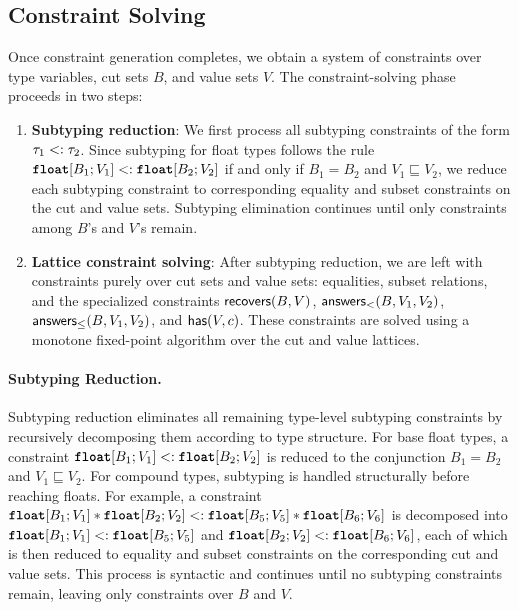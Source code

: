 

\subsection{Constraint Solving}
 \noindent
Once constraint generation completes, we obtain a system of constraints over type variables, cut sets $B$, and value sets $V$. The constraint-solving phase proceeds in two steps:



\begin{enumerate}
    \item \textbf{Subtyping reduction}: We first process all subtyping constraints of the form $\tau_1 <: \tau_2$. Since subtyping for float types follows the rule $\textnormal{\ttfamily\bfseries float}[B_1;V_1] <: \textnormal{\ttfamily\bfseries float}[B_2;V_2]$ if and only if $B_1 = B_2$ and $V_1 \sqsubseteq V_2$, we reduce each subtyping constraint to corresponding equality and subset constraints on the cut and value sets. Subtyping elimination continues until only constraints among $B$'s and $V$'s remain.

    \item \textbf{Lattice constraint solving}: After subtyping reduction, we are left with constraints purely over cut sets and value sets: equalities, subset relations, and the specialized constraints $\mathsf{recovers}(B, V)$, $\mathsf{answers}_<(B, V_1, V_2)$, $\mathsf{answers}_{\leq}(B, V_1, V_2)$, and $\mathsf{has}(V, c)$. These constraints are solved using a monotone fixed-point algorithm over the cut and value lattices.
\end{enumerate}

\paragraph{Subtyping Reduction.}
Subtyping reduction eliminates all remaining type-level subtyping constraints by recursively decomposing them according to type structure.
For base float types, a constraint
$\textnormal{\ttfamily\bfseries float}[B_1;V_1] <: \textnormal{\ttfamily\bfseries float}[B_2;V_2]$
is reduced to the conjunction $B_1 = B_2$ and $V_1 \sqsubseteq V_2$.
For compound types, subtyping is handled structurally before reaching floats.
For example, a constraint
$\textnormal{\ttfamily\bfseries float}[B_1;V_1] * \textnormal{\ttfamily\bfseries float}[B_2;V_2] <: \textnormal{\ttfamily\bfseries float}[B_5;V_5] * \textnormal{\ttfamily\bfseries float}[B_6;V_6]$
is decomposed into
$\textnormal{\ttfamily\bfseries float}[B_1;V_1] <: \textnormal{\ttfamily\bfseries float}[B_5;V_5]$
and
$\textnormal{\ttfamily\bfseries float}[B_2;V_2] <: \textnormal{\ttfamily\bfseries float}[B_6;V_6]$,
each of which is then reduced to equality and subset constraints on the corresponding cut
and value sets.
This process is syntactic and continues until no subtyping constraints remain, leaving only constraints over $B$ and $V$.

